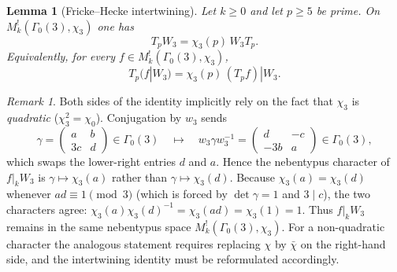 \documentclass[11pt]{amsart}
\newtheorem{lemma}[theorem]{Lemma}
\theoremstyle{remark}
\newtheorem{remark}[theorem]{Remark}
\begin{document}
\begin{lemma}[Fricke--Hecke intertwining]\label{lem:fricke-hecke}
Let $k\ge0$ and let $p\ge5$ be prime. On $M_k^!(\Gamma_0(3),\chi_3)$ one has
\[
T_pW_3=\chi_3(p)\,W_3T_p.
\]
Equivalently, for every $f\in M_k^!(\Gamma_0(3),\chi_3)$,
\[
T_p(f|W_3)=\chi_3(p)\,(T_pf)|W_3.
\]
\end{lemma}

\begin{remark}\label{rem:quadratic-character}
Both sides of the identity implicitly rely on the fact that $\chi_3$ is \emph{quadratic}
($\chi_3^2=\chi_0$). Conjugation by $w_3$ sends
\[
\gamma=\begin{pmatrix}a&b\\3c&d\end{pmatrix}\in\Gamma_0(3)
\quad\longmapsto\quad
w_3\gamma w_3^{-1}=\begin{pmatrix}d&-c\\-3b&a\end{pmatrix}\in\Gamma_0(3),
\]
which swaps the lower-right entries $d$ and $a$. Hence the nebentypus character of $f|_kW_3$ is
$\gamma\mapsto\chi_3(a)$ rather than $\gamma\mapsto\chi_3(d)$. Because $\chi_3(a)=\chi_3(d)$ whenever
$ad\equiv1\pmod{3}$ (which is forced by $\det\gamma=1$ and $3\mid c$), the two characters agree:
$\chi_3(a)\chi_3(d)^{-1}=\chi_3(ad)=\chi_3(1)=1$. Thus $f|_kW_3$ remains in the same nebentypus space
$M_k^!(\Gamma_0(3),\chi_3)$. For a non-quadratic character the analogous statement requires replacing
$\chi$ by $\bar\chi$ on the right-hand side, and the intertwining identity must be reformulated
accordingly.
\end{remark}
\end{document}
